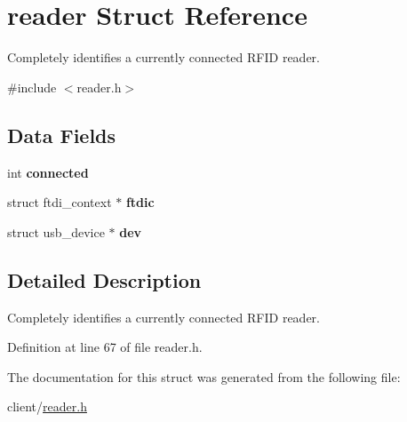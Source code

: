\hypertarget{structreader}{
\section{reader Struct Reference}
\label{structreader}
}


Completely identifies a currently connected RFID reader.  




{\ttfamily \#include $<$reader.h$>$}

\subsection*{Data Fields}
\begin{DoxyCompactItemize}
\item 
\hypertarget{structreader_a9709aefe4930807392898aecb0cb8a79}{
int {\bfseries connected}}
\label{structreader_a9709aefe4930807392898aecb0cb8a79}

\item 
\hypertarget{structreader_a747e6b771bacb9a327fdbc1572918592}{
struct ftdi\_\-context $\ast$ {\bfseries ftdic}}
\label{structreader_a747e6b771bacb9a327fdbc1572918592}

\item 
\hypertarget{structreader_ace407b2e3206b162c83427d88fc62201}{
struct usb\_\-device $\ast$ {\bfseries dev}}
\label{structreader_ace407b2e3206b162c83427d88fc62201}

\end{DoxyCompactItemize}


\subsection{Detailed Description}
Completely identifies a currently connected RFID reader. 

Definition at line 67 of file reader.h.



The documentation for this struct was generated from the following file:\begin{DoxyCompactItemize}
\item 
client/\hyperlink{reader_8h}{reader.h}\end{DoxyCompactItemize}
